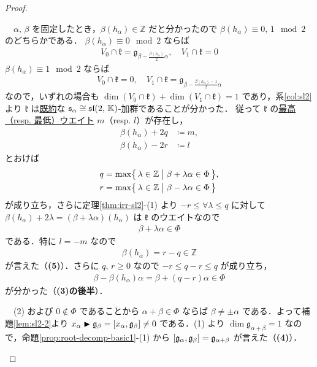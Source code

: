 \documentclass[rep_main]{subfiles}
\begin{document}
\begin{proof}
\begin{description}
		　$\alpha,\, \beta$ を固定したとき，$\beta(h_\alpha) \in \mathbb{Z}$ だと分かったので $\beta(h_\alpha) \equiv 0,\, 1 \mod 2$ のどちらかである．
		$\beta(h_\alpha) \equiv 0 \mod 2$ ならば
		\begin{align}
			V_0 \cap \mathfrak{k} = \mathfrak{g}_{\beta - \frac{\beta(h_\alpha)}{2}\alpha},\quad V_1 \cap \mathfrak{k}= 0
		\end{align}
		$\beta(h_\alpha) \equiv 1 \mod 2$ ならば
		\begin{align}
			V_0 \cap \mathfrak{k} = 0,\quad  V_1 \cap \mathfrak{k}= \mathfrak{g}_{\beta - \frac{\beta(h_\alpha) - 1}{2}\alpha}
		\end{align}
		なので，いずれの場合も $\dim (V_0 \cap \mathfrak{k}) + \dim (V_1 \cap \mathfrak{k}) = 1$ であり，系\ref{col:sl2}より $\mathfrak{k}$ は\hyperref[def:irr]{既約}な $\mathfrak{s}_\alpha \cong \mathfrak{sl}(2,\, \mathbb{K})$-加群であることが分かった．
		従って $\mathfrak{k}$ の\hyperref[eq:maximal-weight]{最高（resp. 最低）ウエイト} $m$（resp. $l$）が存在し，
		\begin{align}
			\beta(h_\alpha) + 2q &\coloneqq m, \\
			\beta(h_\alpha) - 2r &\coloneqq l
		\end{align}
		とおけば
		\begin{align}
			q &= \max \bigl\{\, \lambda \in \mathbb{Z} \bigm| \beta + \lambda\alpha \in \Phi \,\bigr\}, \\
			r &= \max \bigl\{\, \lambda \in \mathbb{Z} \bigm| \beta - \lambda\alpha \in \Phi \,\bigr\} 
		\end{align}
		が成り立ち，さらに定理\ref{thm:irr-sl2}-(1) より $-r \le \forall \lambda \le q$ に対して $\beta(h_\alpha) + 2\lambda = (\beta + \lambda\alpha)(h_\alpha)$ は $\mathfrak{k}$ のウエイトなので
		\begin{align}
			\beta + \lambda\alpha \in \Phi
		\end{align}
		である．特に $l = -m$ なので
		\begin{align}
			\beta(h_\alpha) = r-q \in \mathbb{Z}
		\end{align}
		が言えた（\textbf{(5)}）．さらに $q,\, r \ge 0$ なので $-r \le q-r \le q$ が成り立ち，
		\begin{align}
			\beta - \beta(h_\alpha)\alpha = \beta + (q-r)\alpha \in \Phi
		\end{align}
		が分かった（\textbf{(3)の後半}）．

		　(2) および $0 \notin \Phi$ であることから $\alpha + \beta \in \Phi$ ならば $\beta \neq \pm \alpha$ である．よって補題\ref{lem:sl2-2}より $x_\alpha \btr \mathfrak{g}_\beta = \comm{x_\alpha}{\mathfrak{g}_\beta} \neq 0$ である．(1) より $\dim \mathfrak{g}_{\alpha+\beta} = 1$ なので，命題\ref{prop:root-decomp-basic1}-(1) から $\comm{\mathfrak{g}_\alpha}{\mathfrak{g}_\beta} = \mathfrak{g}_{\alpha+\beta}$ が言えた（\textbf{(4)}）．

		

		\end{description}
\end{proof}
\end{document}
